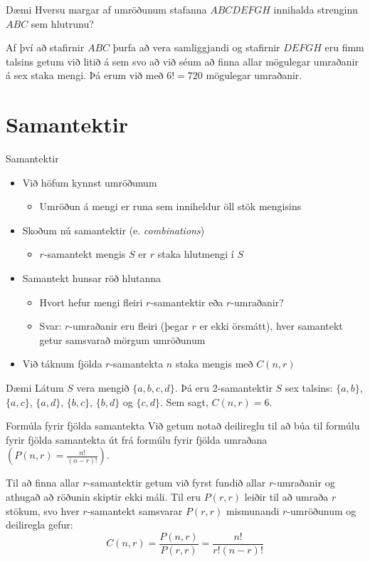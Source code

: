 \documentclass{beamer}
\begin{document}
\begin{frame}{Dæmi}
Hversu margar af umröðunum stafanna $ABCDEFGH$ innihalda strenginn $ABC$ sem hlutrunu? \pause

Af því að stafirnir $ABC$ þurfa að vera samliggjandi og stafirnir $DEFGH$ eru fimm talsins getum við litið á sem svo að við séum að finna allar mögulegar umraðanir á sex staka mengi. Þá erum við með $6! = 720$ mögulegar umraðanir.
\end{frame}

\section{Samantektir}

\begin{frame}{Samantektir}
\begin{itemize}
 \item Við höfum kynnst umröðunum
 \begin{itemize}
  \item Umröðun á mengi er runa sem inniheldur öll stök mengisins
 \end{itemize}
 \item Skoðum nú samantektir (e. \emph{combinations})
 \begin{itemize}
  \item $r$-samantekt mengis $S$ er $r$ staka hlutmengi í $S$
 \end{itemize}
 \item Samantekt hunsar röð hlutanna
 \begin{itemize}
    \item Hvort hefur mengi fleiri $r$-samantektir eða $r$-umraðanir? \pause
    \item Svar: $r$-umraðanir eru fleiri (þegar $r$ er ekki örsmátt), hver samantekt getur samsvarað mörgum umröðunum
 \end{itemize}
 \item Við táknum fjölda $r$-samantekta $n$ staka mengis með $C(n,r)$
\end{itemize}
\end{frame}

\begin{frame}{Dæmi}
Látum $S$ vera mengið $\{a, b, c, d\}$. Þá eru 2-samantektir $S$ sex talsins: $\{a, b\}$, $\{a, c\}$, $\{a, d\}$, $\{b, c\}$, $\{b, d\}$ og $\{c, d\}$. Sem sagt, $C(n, r) = 6$.
\end{frame}

\begin{frame}{Formúla fyrir fjölda samantekta}
Við getum notað deilireglu til að búa til formúlu fyrir fjölda samantekta út frá formúlu fyrir fjölda umraðana $\left(P(n,r) = \frac{n!}{(n-r)!}\right)$.

Til að finna allar $r$-samantektir getum við fyrst fundið allar $r$-umraðanir og athugað að röðunin skiptir ekki máli. Til eru $P(r,r)$ leiðir til að umraða $r$ stökum, svo hver $r$-samantekt samsvarar $P(r,r)$ mismunandi $r$-umröðunum og deiliregla gefur:
\[
 C(n,r) = \frac{P(n,r)}{P(r,r)} = \frac{n!}{r!(n-r)!}
\]
\end{frame}
\end{document}
